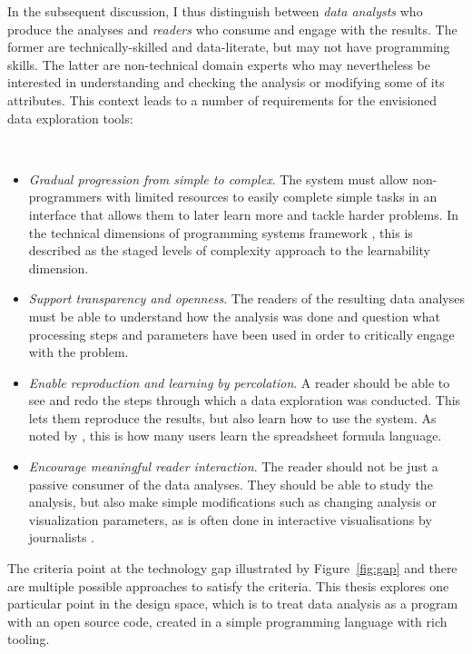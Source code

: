 \documentclass[fleqn,11pt]{report}
\theoremstyle{definition}
\newenvironment{nitemize}
{ \vspace{-0.4em}
  \begin{itemize}
    \setlength{\itemsep}{5pt}
    \setlength{\parskip}{0pt}
    \setlength{\parsep}{0pt} }
{ \end{itemize}
  \vspace{-0.4em} }
\begin{document}
In the subsequent discussion, I thus distinguish between \emph{data analysts} who produce the
analyses and \emph{readers} who consume and engage with the results. The former are
technically-skilled and data-literate, but may not have programming skills. The latter are
non-technical domain experts who may nevertheless be interested
in understanding and checking the analysis or modifying some of its attributes.
This context leads to a number of requirements for the envisioned data exploration tools:

~

\begin{nitemize}
\item \emph{Gradual progression from simple to complex}. The system must allow non-program\-mers with
limited resources to easily complete simple tasks in an interface that allows them to later
learn more and tackle harder problems. In the technical dimensions of programming systems
framework \citep{jakubovic-2023-techdims}, this is described as the staged levels of complexity
approach to the learnability dimension.

\item \emph{Support transparency and openness}. The readers of the resulting data analyses must
be able to understand how the analysis was done and question what processing steps and parameters
have been used in order to critically engage with the problem.

\item \emph{Enable reproduction and learning by percolation}. A reader should be able to see and
redo the steps through which a data exploration was conducted. This lets them reproduce the results,
but also learn how to use the system. As noted by \citet{sarkar-2018-spreadsheets}, this is how
many users learn the spreadsheet formula language.

\item \emph{Encourage meaningful reader interaction}. The reader should not be just a passive
consumer of the data analyses. They should be able to study the analysis, but
also make simple modifications such as changing analysis or visualization parameters,
as is often done in interactive visualisations by journalists \citep{kennedy-2021-engagements}.
\end{nitemize}

The criteria point at the technology gap illustrated by Figure~\ref{fig:gap} and there are multiple
possible approaches to satisfy the criteria. This thesis explores one particular point in the design space,
which is to treat data analysis as a program with an open source code, created in a simple
programming language with rich tooling.
\end{document}
